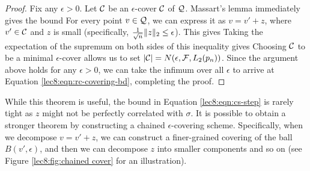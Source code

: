 \begin{proof}
Fix any $\epsilon > 0$. Let $\mathcal C$ be an $\epsilon$-cover $\mathcal C$ of $\mathcal Q$. Massart's lemma immediately gives the bound
For every point $v\in \mathcal Q$, we can express it as $v=v'+z$, where $v'\in \mathcal C$ and $z$ is small (specifically, $\frac 1 {\sqrt{n}} \|z\|_2 \le \epsilon$). This gives
Taking the expectation of the supremum on both sides of this inequality gives
Choosing $\mathcal C$ to be a minimal $\epsilon$-cover allows us to set $|\mathcal C| = N(\epsilon, \mathcal F , L_2(p_n))$. Since the argument above holds for any $\epsilon > 0$, we can take the infimum over all $\epsilon$ to arrive at Equation \eqref{lec8:eqn:rc-covering-bd}, completing the proof.

\end{proof}

While this theorem is useful, the bound in Equation \eqref{lec8:eqn:cs-step} is rarely tight as $z$ might not be perfectly correlated with $\sigma$. It is possible to obtain a stronger theorem by constructing a chained $\epsilon$-covering scheme. Specifically, when we decompose $v=v'+z$, we can construct a finer-grained covering of the ball $B(v',\epsilon)$, and then we can decompose $z$ into smaller components and so on (see Figure \ref{lec8:fig:chained cover} for an illustration).

